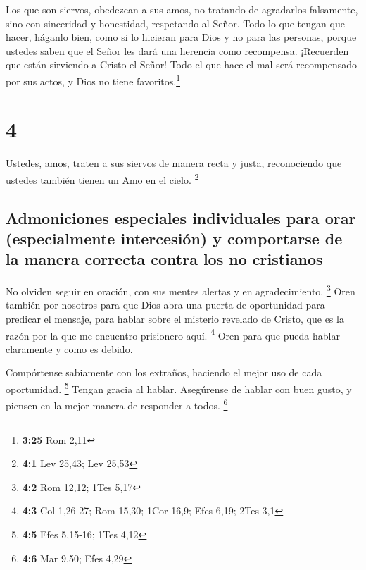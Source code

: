  Los que son siervos, obedezcan a sus amos, no tratando
de agradarlos falsamente, sino con sinceridad y honestidad, respetando
al Señor.  Todo lo que tengan que hacer, háganlo bien,
como si lo hicieran para Dios y no para las personas, 
porque ustedes saben que el Señor les dará una herencia como recompensa.
¡Recuerden que están sirviendo a Cristo el Señor!  Todo
el que hace el mal será recompensado por sus actos, y Dios no tiene
favoritos.\footnote{\textbf{3:25} Rom 2,11}

\hypertarget{section-3}{%
\section{4}\label{section-3}}

 Ustedes, amos, traten a sus siervos de manera recta y
justa, reconociendo que ustedes también tienen un Amo en el cielo.
\footnote{\textbf{4:1} Lev 25,43; Lev 25,53}

\hypertarget{admoniciones-especiales-individuales-para-orar-especialmente-intercesiuxf3n-y-comportarse-de-la-manera-correcta-contra-los-no-cristianos}{%
\subsection{Admoniciones especiales individuales para orar
(especialmente intercesión) y comportarse de la manera correcta contra
los no
cristianos}\label{admoniciones-especiales-individuales-para-orar-especialmente-intercesiuxf3n-y-comportarse-de-la-manera-correcta-contra-los-no-cristianos}}

 No olviden seguir en oración, con sus mentes alertas y en
agradecimiento. \footnote{\textbf{4:2} Rom 12,12; 1Tes 5,17}
 Oren también por nosotros para que Dios abra una puerta
de oportunidad para predicar el mensaje, para hablar sobre el misterio
revelado de Cristo, que es la razón por la que me encuentro prisionero
aquí. \footnote{\textbf{4:3} Col 1,26-27; Rom 15,30; 1Cor 16,9; Efes
  6,19; 2Tes 3,1}  Oren para que pueda hablar claramente y
como es debido.

 Compórtense sabiamente con los extraños, haciendo el
mejor uso de cada oportunidad. \footnote{\textbf{4:5} Efes 5,15-16; 1Tes
  4,12}  Tengan gracia al hablar. Asegúrense de hablar con
buen gusto, y piensen en la mejor manera de responder a todos.
\footnote{\textbf{4:6} Mar 9,50; Efes 4,29}

